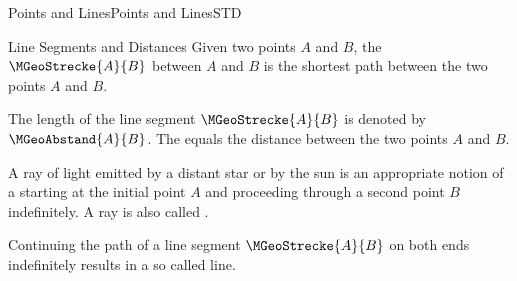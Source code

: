 \begin{MXContent}{Points and Lines}{Points and Lines}{STD}
\begin{MXInfo}{Line Segments and Distances}
Given two points $A$ and $B$, the  $\MGeoStrecke{A}{B}$
between $A$ and $B$ is the shortest path between the two points $A$ and $B$.

\begin{center}
\end{center}

The length of the line segment $\MGeoStrecke{A}{B}$ is denoted by $\MGeoAbstand{A}{B}$. 
The  equals the distance between the two points $A$ and $B$.
\end{MXInfo}

A ray of light emitted by a distant star or by the sun is an appropriate notion of a 
 starting at the initial point $A$ and proceeding through a second point $B$ indefinitely. A
ray is also called .

\begin{center}
\end{center}

Continuing the path of a line segment $\MGeoStrecke{A}{B}$ on both ends indefinitely results in 
a so called line.


\end{MXContent}
